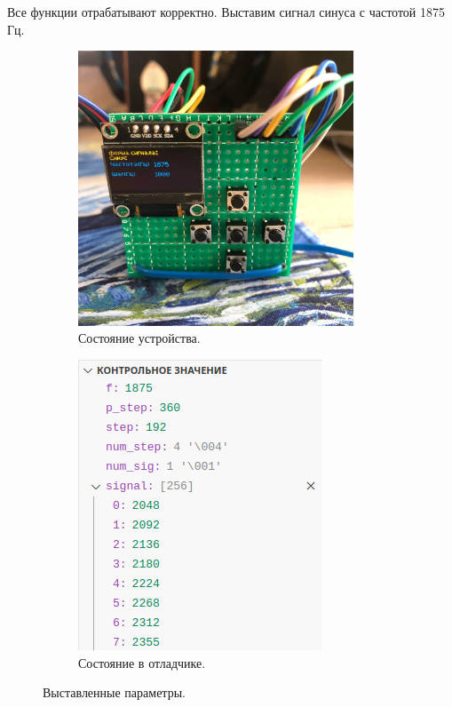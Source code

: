 	Все функции отрабатывают корректно. Выставим сигнал синуса с частотой 1875 Гц.
	
	\begin{figure}[H]\captionsetup[subfigure]{font=normalsize}
     \begin{subfigure}[H]{0.5\textwidth}
         \centering
         \includegraphics[width=0.9\textwidth]{../image/test4_u_f.jpg}
         \caption{Состояние устройства.}
    	\end{subfigure}
     \hfill
     \begin{subfigure}[H]{0.5\textwidth}
         \centering
         \includegraphics[width=0.8\textwidth]{../image/test4_o_f.png}
         \caption{Состояние в отладчике.}
     \end{subfigure}
        \caption{Выставленные параметры.}
	\end{figure}
	
